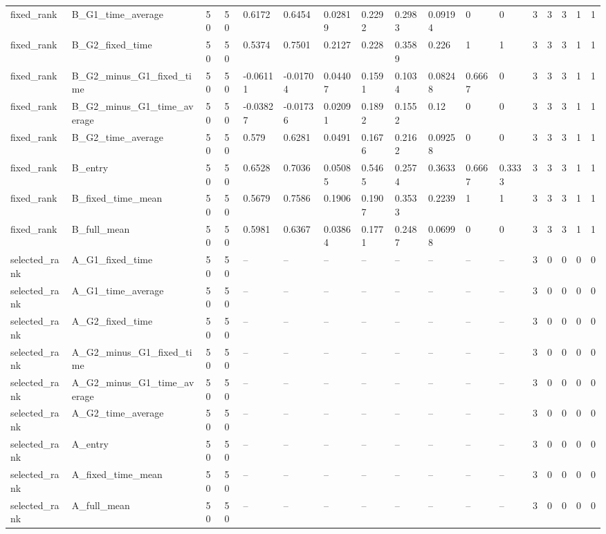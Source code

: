 \begin{longtable}{lllllllllllllllll}
fixed\_rank & B\_G1\_time\_average & 50 & 50 & 0.6172 & 0.6454 & 0.02819 & 0.2292 & 0.2983 & 0.09194 & 0 & 0 & 3 & 3 & 3 & 1 & 1 \\
fixed\_rank & B\_G2\_fixed\_time & 50 & 50 & 0.5374 & 0.7501 & 0.2127 & 0.228 & 0.3589 & 0.226 & 1 & 1 & 3 & 3 & 3 & 1 & 1 \\
fixed\_rank & B\_G2\_minus\_G1\_fixed\_time & 50 & 50 & -0.06111 & -0.01704 & 0.04407 & 0.1591 & 0.1034 & 0.08248 & 0.6667 & 0 & 3 & 3 & 3 & 1 & 1 \\
fixed\_rank & B\_G2\_minus\_G1\_time\_average & 50 & 50 & -0.03827 & -0.01736 & 0.02091 & 0.1892 & 0.1552 & 0.12 & 0 & 0 & 3 & 3 & 3 & 1 & 1 \\
fixed\_rank & B\_G2\_time\_average & 50 & 50 & 0.579 & 0.6281 & 0.0491 & 0.1676 & 0.2162 & 0.09258 & 0 & 0 & 3 & 3 & 3 & 1 & 1 \\
fixed\_rank & B\_entry & 50 & 50 & 0.6528 & 0.7036 & 0.05085 & 0.5465 & 0.2574 & 0.3633 & 0.6667 & 0.3333 & 3 & 3 & 3 & 1 & 1 \\
fixed\_rank & B\_fixed\_time\_mean & 50 & 50 & 0.5679 & 0.7586 & 0.1906 & 0.1907 & 0.3533 & 0.2239 & 1 & 1 & 3 & 3 & 3 & 1 & 1 \\
fixed\_rank & B\_full\_mean & 50 & 50 & 0.5981 & 0.6367 & 0.03864 & 0.1771 & 0.2487 & 0.06998 & 0 & 0 & 3 & 3 & 3 & 1 & 1 \\
selected\_rank & A\_G1\_fixed\_time & 50 & 50 & -- & -- & -- & -- & -- & -- & -- & -- & 3 & 0 & 0 & 0 & 0 \\
selected\_rank & A\_G1\_time\_average & 50 & 50 & -- & -- & -- & -- & -- & -- & -- & -- & 3 & 0 & 0 & 0 & 0 \\
selected\_rank & A\_G2\_fixed\_time & 50 & 50 & -- & -- & -- & -- & -- & -- & -- & -- & 3 & 0 & 0 & 0 & 0 \\
selected\_rank & A\_G2\_minus\_G1\_fixed\_time & 50 & 50 & -- & -- & -- & -- & -- & -- & -- & -- & 3 & 0 & 0 & 0 & 0 \\
selected\_rank & A\_G2\_minus\_G1\_time\_average & 50 & 50 & -- & -- & -- & -- & -- & -- & -- & -- & 3 & 0 & 0 & 0 & 0 \\
selected\_rank & A\_G2\_time\_average & 50 & 50 & -- & -- & -- & -- & -- & -- & -- & -- & 3 & 0 & 0 & 0 & 0 \\
selected\_rank & A\_entry & 50 & 50 & -- & -- & -- & -- & -- & -- & -- & -- & 3 & 0 & 0 & 0 & 0 \\
selected\_rank & A\_fixed\_time\_mean & 50 & 50 & -- & -- & -- & -- & -- & -- & -- & -- & 3 & 0 & 0 & 0 & 0 \\
selected\_rank & A\_full\_mean & 50 & 50 & -- & -- & -- & -- & -- & -- & -- & -- & 3 & 0 & 0 & 0 & 0 \\

\end{longtable}
